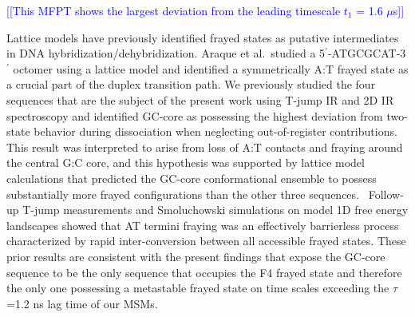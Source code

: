 \documentclass[journal=jpcbfk,manuscript=article]{achemso}
\newcommand*{\noteb}[1]{\textcolor{blue}{[[#1]]}}		%
\begin{document}
\noteb{This MFPT shows the largest deviation from the leading timescale $t_1$ = 1.6 $\mu$s}

Lattice models have previously identified frayed states as putative intermediates in DNA hybridization/dehybridization.\citep{Araque2016LatticeCooperativity, Phys2019,Sanstead2016} Araque et al.\ studied a 5$^\prime$-ATGCGCAT-3$^\prime$ octomer using a lattice model and identified a symmetrically A:T frayed state as a crucial part of the duplex transition path.\citep{Araque2016LatticeCooperativity} We previously studied the four sequences that are the subject of the present work using T-jump IR and 2D IR spectroscopy and identified GC-core as possessing the highest deviation from two-state behavior during dissociation when neglecting out-of-register contributions.\citep{Sanstead2016} This result was interpreted to arise from loss of A:T contacts and fraying around the central G:C core, and this hypothesis was supported by lattice model calculations that predicted the GC-core conformational ensemble to possess substantially more frayed configurations than the other three sequences.~\citep{Phys2019} Follow-up T-jump measurements and Smoluchowski simulations on model 1D free energy landscapes showed that AT termini fraying was an effectively barrierless process characterized by rapid inter-conversion between all accessible frayed states.\citep{Sanstead2018DirectDehybridization} These prior results are consistent with the present findings that expose the GC-core sequence to be the only sequence that occupies the F4 frayed state and therefore the only one possessing a metastable frayed state on time scales exceeding the $\tau$=1.2 ns lag time of our MSMs.

\end{document}
